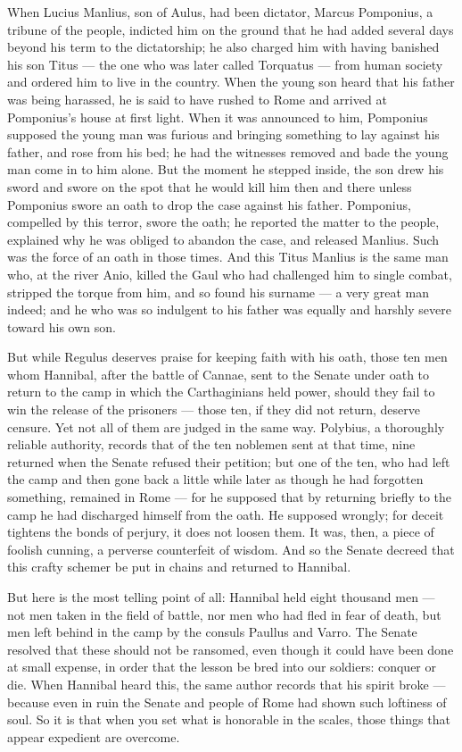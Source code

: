  When Lucius Manlius, son of Aulus, had been dictator, Marcus Pomponius, a tribune of the people, indicted him on the ground that he had added several days beyond his term to the dictatorship; he also charged him with having banished his son Titus — the one who was later called Torquatus — from human society and ordered him to live in the country. When the young son heard that his father was being harassed, he is said to have rushed to Rome and arrived at Pomponius's house at first light. When it was announced to him, Pomponius supposed the young man was furious and bringing something to lay against his father, and rose from his bed; he had the witnesses removed and bade the young man come in to him alone. But the moment he stepped inside, the son drew his sword and swore on the spot that he would kill him then and there unless Pomponius swore an oath to drop the case against his father. Pomponius, compelled by this terror, swore the oath; he reported the matter to the people, explained why he was obliged to abandon the case, and released Manlius. Such was the force of an oath in those times. And this Titus Manlius is the same man who, at the river Anio, killed the Gaul who had challenged him to single combat, stripped the torque from him, and so found his surname — a very great man indeed; and he who was so indulgent to his father was equally and harshly severe toward his own son.

 But while Regulus deserves praise for keeping faith with his oath, those ten men whom Hannibal, after the battle of Cannae, sent to the Senate under oath to return to the camp in which the Carthaginians held power, should they fail to win the release of the prisoners — those ten, if they did not return, deserve censure. Yet not all of them are judged in the same way. Polybius, a thoroughly reliable authority, records that of the ten noblemen sent at that time, nine returned when the Senate refused their petition; but one of the ten, who had left the camp and then gone back a little while later as though he had forgotten something, remained in Rome — for he supposed that by returning briefly to the camp he had discharged himself from the oath. He supposed wrongly; for deceit tightens the bonds of perjury, it does not loosen them. It was, then, a piece of foolish cunning, a perverse counterfeit of wisdom. And so the Senate decreed that this crafty schemer be put in chains and returned to Hannibal.

 But here is the most telling point of all: Hannibal held eight thousand men — not men taken in the field of battle, nor men who had fled in fear of death, but men left behind in the camp by the consuls Paullus and Varro. The Senate resolved that these should not be ransomed, even though it could have been done at small expense, in order that the lesson be bred into our soldiers: conquer or die. When Hannibal heard this, the same author records that his spirit broke — because even in ruin the Senate and people of Rome had shown such loftiness of soul. So it is that when you set what is honorable in the scales, those things that appear expedient are overcome.

